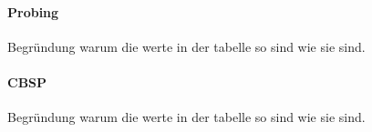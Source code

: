 \paragraph{Probing}
Begründung warum die werte in der tabelle so sind wie sie sind. \\

\paragraph{CBSP}
Begründung warum die werte in der tabelle so sind wie sie sind. \\
